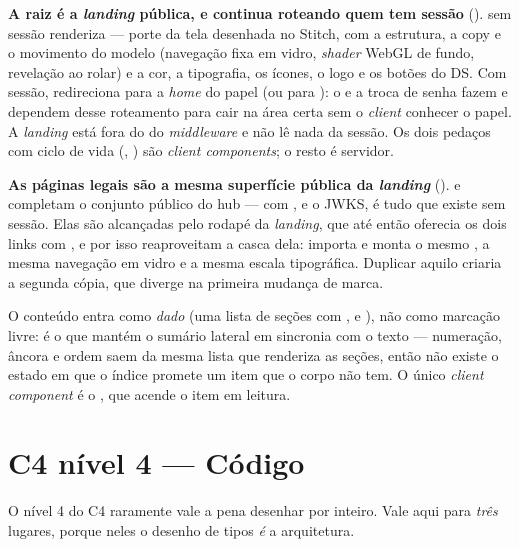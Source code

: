 \begin{nota}
\textbf{A raiz é a \emph{landing} pública, e continua roteando quem tem sessão}
(). \rota{/} sem sessão renderiza  ---
porte da tela desenhada no Stitch, com a estrutura, a copy e o movimento do
modelo (navegação fixa em vidro, \emph{shader} WebGL de fundo, revelação ao
rolar) e a cor, a tipografia, os ícones, o logo e os botões do DS. Com sessão,
\rota{/} redireciona para a \emph{home} do papel (ou para ):
o  e a troca de senha fazem  e dependem
desse roteamento para cair na área certa sem o \emph{client} conhecer o papel. A
\emph{landing} está fora do  do \emph{middleware} e não lê nada da
sessão. Os dois pedaços com ciclo de vida (,
) são \emph{client components}; o resto é servidor.
\end{nota}

\begin{nota}
\textbf{As páginas legais são a mesma superfície pública da \emph{landing}}
().  e  completam o conjunto
público do hub --- com \rota{/},  e o JWKS, é tudo que existe sem
sessão. Elas são alcançadas pelo rodapé da \emph{landing}, que até então
oferecia os dois links com , e por isso reaproveitam a casca dela:
 importa  e monta o mesmo
, a mesma navegação em vidro e a mesma escala tipográfica.
Duplicar aquilo criaria a segunda cópia, que diverge na primeira mudança de
marca.

O conteúdo entra como \emph{dado} (uma lista de seções com ,
 e ), não como marcação livre: é o que mantém o sumário
lateral em sincronia com o texto --- numeração, âncora e ordem saem da mesma
lista que renderiza as seções, então não existe o estado em que o índice promete
um item que o corpo não tem. O único \emph{client component} é o
, que acende o item em leitura.
\end{nota}

\section{C4 nível 4 --- Código}
\label{sec:c4l4}

O nível 4 do C4 raramente vale a pena desenhar por inteiro. Vale aqui para
\emph{três} lugares, porque neles o desenho de tipos \emph{é} a arquitetura.


